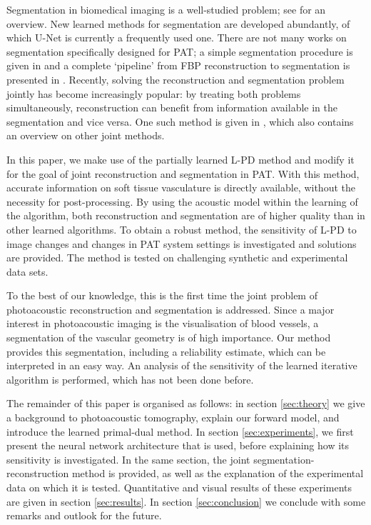 \documentclass[journal]{IEEEtran}
\begin{document}
Segmentation in biomedical imaging is a well-studied problem; see \cite{Acton2009} for an overview. New learned methods for segmentation are developed abundantly, of which U-Net \cite{Ronneberger2015} is currently a frequently used one. There are not many works on segmentation specifically designed for PAT; a simple segmentation procedure is given in \cite{Soetikno2012} and a complete `pipeline' from FBP reconstruction to segmentation is presented in \cite{Raumonen2018}. Recently, solving the reconstruction and segmentation problem jointly has become increasingly popular: by treating both problems simultaneously, reconstruction can benefit from information available in the segmentation and vice versa. One such method is given in \cite{Corona2018}, which also contains an overview on other joint methods.

In this paper, we make use of the partially learned L-PD method and modify it for the goal of joint reconstruction and segmentation in PAT. With this method, accurate information on soft tissue vasculature is directly available, without the necessity for post-processing. By using the acoustic model within the learning of the algorithm, both reconstruction and segmentation are of higher quality than in other learned algorithms. To obtain a robust method, the sensitivity of L-PD to image changes and changes in PAT system settings is investigated and solutions are provided. The method is tested on challenging synthetic and experimental data sets.

To the best of our knowledge, this is the first time the joint problem of photoacoustic reconstruction and segmentation is addressed. Since a major interest in photoacoustic imaging is the visualisation of blood vessels, a segmentation of the vascular geometry is of high importance. Our method provides this segmentation, including a reliability estimate, which can be interpreted in an easy way. An analysis of the sensitivity of the learned iterative algorithm is performed, which has not been done before.

The remainder of this paper is organised as follows: in section \ref{sec:theory} we give a background to photoacoustic tomography, explain our forward model, and introduce the learned primal-dual method. In section \ref{sec:experiments}, we first present the neural network architecture that is used, before explaining how its sensitivity is investigated. In the same section, the joint segmentation-reconstruction method is provided, as well as the explanation of the experimental data on which it is tested. Quantitative and visual results of these experiments are given in section \ref{sec:results}. In section \ref{sec:conclusion} we conclude with some remarks and outlook for the future.
\end{document}
